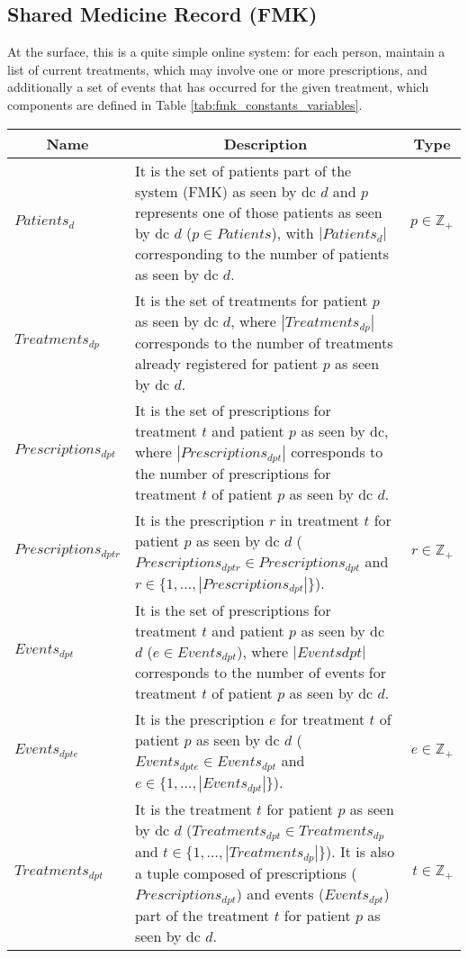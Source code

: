 \subsection{Shared Medicine Record (FMK)}
At the surface, this is a quite simple online system: for each person, maintain a list of current treatments, which may involve one or more prescriptions, and additionally a set of events that has occurred for the given treatment, which components are defined in Table \ref{tab:fmk_constants_variables}.
\begin{table*}[!ht]
	\begin{tabular}{|p{2.4cm}|p{13.2cm}|r| }
		\hline
		\multicolumn{1}{|c|}{Name} & \multicolumn{1}{c|}{Description} & \multicolumn{1}{c|}{Type} \\
		\hline
		\hline
		$Patients_{d}$ & It is the set of patients part of the system (FMK) as seen by \gls{dc} $d$ and $p$ represents one of those patients as seen by \gls{dc} $d$ ($p \in Patients$), with $|Patients_{d}|$ corresponding to the number of patients as seen by \gls{dc} $d$. & $p \in \mathbb{Z}_{+}$ \\
		\hline
		$Treatments_{dp}$ & It is the set of treatments for patient $p$ as seen by \gls{dc} $d$, where $|Treatments_{dp}|$ corresponds to the number of treatments already registered for patient $p$ as seen by \gls{dc} $d$. &  \\
		\hline
		$Prescriptions_{dpt}$ & It is the set of prescriptions for treatment $t$ and patient $p$ as seen by \gls{dc}, where $|Prescriptions_{dpt}|$ corresponds to the number of prescriptions for treatment $t$ of patient $p$ as seen by \gls{dc} $d$. &  \\
		\hline
		$Prescriptions_{dptr}$ & It is the prescription $r$ in treatment $t$ for patient $p$ as seen by \gls{dc} $d$ ($Prescriptions_{dptr} \in Prescriptions_{dpt}$ and $r \in \{1,\dots, |Prescriptions_{dpt}|\}$). & $r \in \mathbb{Z}_{+}$ \\
		\hline
		$Events_{dpt}$ & It is the set of prescriptions for treatment $t$ and patient $p$ as seen by \gls{dc} $d$ ($e \in Events_{dpt}$), where $|Events{dpt}|$ corresponds to the number of events for treatment $t$ of patient $p$ as seen by \gls{dc} $d$. &  \\
		\hline
		$Events_{dpte}$ & It is the prescription $e$ for treatment $t$ of patient $p$ as seen by \gls{dc} $d$ ($Events_{dpte} \in Events_{dpt}$ and $e \in \{1,\dots, |Events_{dpt}|\}$). & $e \in \mathbb{Z}_{+}$ \\
		\hline
		$Treatments_{dpt}$ & It is the treatment $t$ for patient $p$ as seen by \gls{dc} $d$ ($Treatments_{dpt} \in Treatments_{dp}$ and $t \in \{1,\dots, |Treatments_{dp}|\}$). It is also a tuple composed of prescriptions ($Prescriptions_{dpt}$) and events ($Events_{dpt}$) part of the treatment $t$ for patient $p$ as seen by \gls{dc} $d$. & $t \in \mathbb{Z}_{+}$ \\
		\hline
	\end{tabular}
	
	\caption{FMK Constants and Variables.}
	\label{tab:fmk_constants_variables}
\end{table*}

